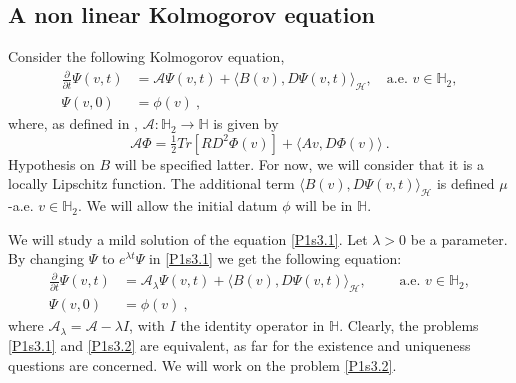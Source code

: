 \documentclass[review,onefignum,onetabnum]{siamart190516}
\begin{document}
\subsection{A non linear Kolmogorov equation}
    Consider the following \sloppy Kolmogorov equation,
%
    \begin{equation}
        \label{P1s3.1}
        \begin{aligned}
            \frac{\partial}{\partial t}
                \Psi(v,t)
                &=
                   \mathcal{A}\Psi(v,t)
                    +
                    \langle
                        B(v),D\Psi(v,t)
                    \rangle_\mathcal{H},
                    \quad \text{a.e. }
                    v\in\mathbb{H}_2,
            \\
            \Psi(v,0)
                &=
                    \phi(v)\nonumber \ ,
        \end{aligned}
    \end{equation}
%
    where, as defined in ,
    $\mathcal{A}:\mathbb{H}_2 \to \mathbb{H}$ is given by
%
    \begin{equation}\label{def-A}
        \mathcal{A} \Phi =
            \tfrac{1}{2} Tr[RD^2 \Phi(v)]
            +
            \langle
                A v, D\Phi(v)
            \rangle \ .
     \end{equation}
        Hypothesis on $B$ will be specified latter. For now, we will consider 
    that it is a locally Lipschitz function. The additional term
    $ \langle B(v),D\Psi(v,t) \rangle_\mathcal{H}$ is defined $\mu$-a.e.
    $v\in\mathbb{H}_2$. We will allow the initial datum $\phi$ will be
    in $\mathbb{H}$.

        We will study a mild solution of the equation \eqref{P1s3.1}. Let 
    $\lambda>0$ be a parameter. By changing $\Psi$ to $e^{\lambda t}\Psi$ in
    \eqref{P1s3.1} we get the following equation:
    \begin{align*}
        \label{P1s3.2}
        \frac{\partial}{\partial t}\Psi(v,t)
            &= \mathcal{A}_\lambda\Psi(v,t)
            +
            \langle
                B(v),D\Psi(v,t)
            \rangle_\mathcal{H},
            \qquad \text{ a.e. }
            v \in \mathbb{H}_2,
        \\
        \Psi(v,0)
            &= \phi(v) \ ,
    \end{align*}
    where $\mathcal{A}_\lambda=\mathcal{A}-\lambda I$, with $I$ the identity
    operator in $\mathbb{H}$. Clearly, the problems \eqref{P1s3.1} and
    \eqref{P1s3.2} are equivalent, as far for the existence and uniqueness
    questions are concerned. We will work on the problem \eqref{P1s3.2}.
\end{document}
